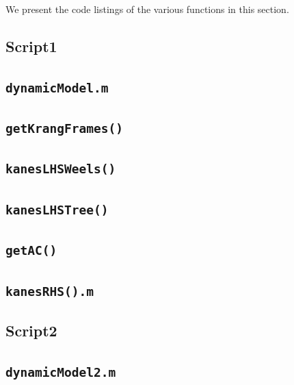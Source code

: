 \documentclass[a4paper,10pt]{article}
\begin{document}
We present the code listings of the various functions in this section.

\subsection{Script1}

\subsection{\texttt{dynamicModel.m}}


\subsection{\texttt{getKrangFrames()}}


\subsection{\texttt{kanesLHSWeels()}}


\subsection{\texttt{kanesLHSTree()}}

 
\subsection{\texttt{getAC()}}


\subsection{\texttt{kanesRHS().m}}


\subsection{Script2}

\subsection{\texttt{dynamicModel2.m}}

\end{document}
